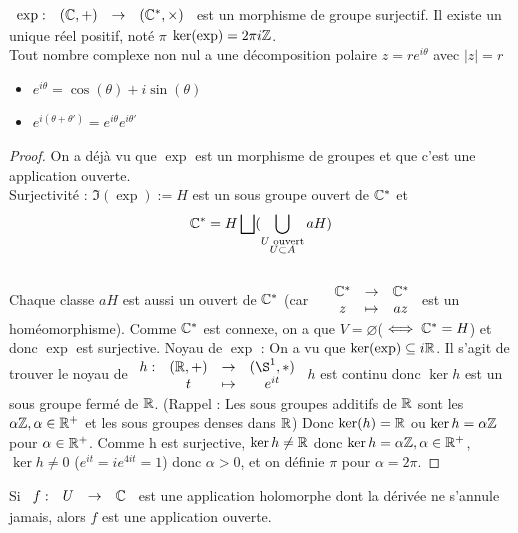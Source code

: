 \documentclass[]{report}
\begin{document}
\begin{tm}{}{}
    $\begin{array}{ccccc}
\exp : & (\mathbb{C},+) & \to & (\mathbb{C}^*,\times)
\end{array}$ est un morphisme de groupe surjectif. Il existe un unique réel positif, noté $\pi$ \tq $\ker(\exp)=2\pi i \mathbb{Z}$.\\
Tout nombre complexe non nul a une décomposition polaire $z=re^{i\theta}$ avec $|z|=r$\\
\begin{itemize}
    \item$e^{i\theta}=\cos(\theta)+i\sin(\theta)$
    \item $e^{i(\theta+\theta')}=e^{i\theta}e^{i\theta'}$
\end{itemize}
\end{tm}

\begin{proof}{}{}
    On a déjà vu que $\exp$ est un morphisme de groupes et que c'est une application ouverte.\\
    Surjectivité : $\Im(\exp):=H$ est un sous groupe ouvert de $\mathbb{C}^*$ et \[\mathbb{C}^*=H\bigsqcup(\bigcup_{\substack{U \text{ ouvert}\\U \subset A}}aH)\] \\
Chaque classe $aH$ est aussi un ouvert de $\mathbb{C}^*$ (car $\begin{array}{ccccc}
& \mathbb{C}^* & \to & \mathbb{C}^* \\
& z & \mapsto & az
\end{array}$ est un homéomorphisme). Comme $\mathbb{C}^*$ est connexe, on a que $V=\varnothing $($\iff \mathbb{C}^*=H$) et donc $\exp$ est surjective. Noyau de $\exp$ : On a vu que $\ker(\exp)\subseteq i \mathbb{R}$. Il s'agit de trouver le noyau de $\begin{array}{ccccc}
h : & (\R,+) & \to & (\S^1,*) \\
  & t & \mapsto & e^{it}
\end{array}$ $h$ est continu donc $\ker h$ est un sous groupe fermé de $\mathbb{R}$. (Rappel : Les sous groupes additifs de $\mathbb{R}$ sont les $\alpha \mathbb{Z} , \alpha\in\mathbb{R}^+$ et les sous groupes denses dans $\mathbb{R}$) Donc $\ker(h)=\mathbb{R}$ ou $\ker h=\alpha\mathbb{Z}$ pour $\alpha\in\mathbb{R}^+$. Comme h est surjective, $\ker h \neq\mathbb{R}$ donc $\ker h = \alpha \mathbb{Z}, \alpha\in\mathbb{R}^+$, $\ker h \neq 0$ ($e^{it}=ie^{4it}=1$) donc $\alpha>0$, et on définie $\pi$ pour $\alpha=2\pi$.
\end{proof}

\begin{cor}{}{}
    Si $\begin{array}{ccccc}
f : & U & \to & \mathbb{C}
\end{array}$ est une application holomorphe dont la dérivée ne s'annule jamais, alors $f$ est une application ouverte.
\end{cor}
\end{document}
